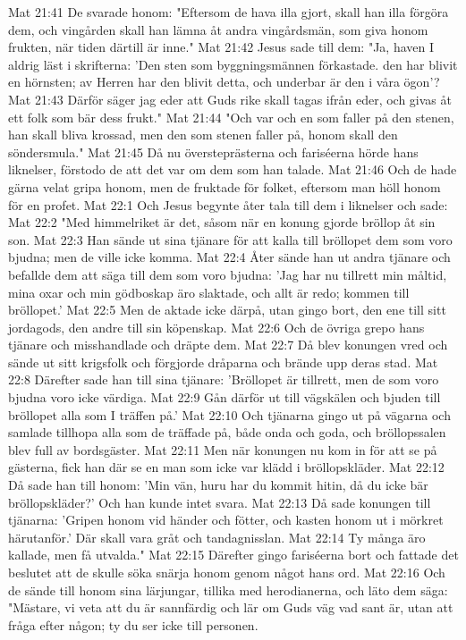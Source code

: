 Mat 21:41  De svarade honom: "Eftersom de hava illa gjort, skall han illa förgöra dem, och vingården skall han lämna åt andra vingårdsmän, som giva honom frukten, när tiden därtill är inne."
Mat 21:42  Jesus sade till dem: "Ja, haven I aldrig läst i skrifterna: 'Den sten som byggningsmännen förkastade. den har blivit en hörnsten; av Herren har den blivit detta, och underbar är den i våra ögon'?
Mat 21:43  Därför säger jag eder att Guds rike skall tagas ifrån eder, och givas åt ett folk som bär dess frukt."
Mat 21:44  "Och var och en som faller på den stenen, han skall bliva krossad, men den som stenen faller på, honom skall den söndersmula."
Mat 21:45  Då nu översteprästerna och fariséerna hörde hans liknelser, förstodo de att det var om dem som han talade.
Mat 21:46  Och de hade gärna velat gripa honom, men de fruktade för folket, eftersom man höll honom för en profet.
Mat 22:1  Och Jesus begynte åter tala till dem i liknelser och sade:
Mat 22:2  "Med himmelriket är det, såsom när en konung gjorde bröllop åt sin son.
Mat 22:3  Han sände ut sina tjänare för att kalla till bröllopet dem som voro bjudna; men de ville icke komma.
Mat 22:4  Åter sände han ut andra tjänare och befallde dem att säga till dem som voro bjudna: 'Jag har nu tillrett min måltid, mina oxar och min gödboskap äro slaktade, och allt är redo; kommen till bröllopet.'
Mat 22:5  Men de aktade icke därpå, utan gingo bort, den ene till sitt jordagods, den andre till sin köpenskap.
Mat 22:6  Och de övriga grepo hans tjänare och misshandlade och dräpte dem.
Mat 22:7  Då blev konungen vred och sände ut sitt krigsfolk och förgjorde dråparna och brände upp deras stad.
Mat 22:8  Därefter sade han till sina tjänare: 'Bröllopet är tillrett, men de som voro bjudna voro icke värdiga.
Mat 22:9  Gån därför ut till vägskälen och bjuden till bröllopet alla som I träffen på.'
Mat 22:10  Och tjänarna gingo ut på vägarna och samlade tillhopa alla som de träffade på, både onda och goda, och bröllopssalen blev full av bordsgäster.
Mat 22:11  Men när konungen nu kom in för att se på gästerna, fick han där se en man som icke var klädd i bröllopskläder.
Mat 22:12  Då sade han till honom: 'Min vän, huru har du kommit hitin, då du icke bär bröllopskläder?' Och han kunde intet svara.
Mat 22:13  Då sade konungen till tjänarna: 'Gripen honom vid händer och fötter, och kasten honom ut i mörkret härutanför.' Där skall vara gråt och tandagnisslan.
Mat 22:14  Ty många äro kallade, men få utvalda."
Mat 22:15  Därefter gingo fariséerna bort och fattade det beslutet att de skulle söka snärja honom genom något hans ord.
Mat 22:16  Och de sände till honom sina lärjungar, tillika med herodianerna, och läto dem säga: "Mästare, vi veta att du är sannfärdig och lär om Guds väg vad sant är, utan att fråga efter någon; ty du ser icke till personen.
